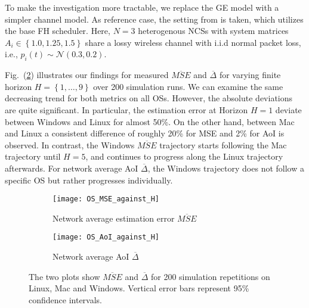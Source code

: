 To make the investigation more tractable, we replace the GE model with a simpler
channel model. As reference case, the setting from \cite{ayan2020aoi} is taken,
which utilizes the base FH scheduler. Here, $N=3$ heterogenous NCSs with system
matrices $A_i\in\left\{1.0, 1.25, 1.5 \right\}$ share a lossy wireless channel
with i.i.d normal packet loss, i.e., $p_i(t) \sim \mathcal{N}(0.3,0.2)$. 

Fig.~(\ref{fig:observation}) illustrates our findings for measured
$\overline{MSE}$ and $\overline{\Delta}$ for varying finite horizon $H=\left\{1,
\dots, 9\right\}$ over 200 simulation runs. We can examine the same decreasing
trend for both metrics on all OSs. However, the absolute deviations are quite
significant. In particular, the estimation error at Horizon $H=1$ deviate
between Windows and Linux for almost 50\%. On the other hand, between Mac and
Linux a consistent difference of roughly 20\% for MSE and 2\% for AoI is
observed. In contrast, the Windows $\overline{MSE}$ trajectory starts following
the Mac trajectory until $H=5$, and continues to progress along the Linux
trajectory afterwards. For network average AoI $\overline{\Delta}$, the Windows
trajectory does not follow a specific OS but rather progresses individually.

\begin{figure}[htb]
  \centering
  \begin{subfigure}[b]{0.49\textwidth}
    \centering
    \texttt{[image: OS\_MSE\_against\_H]} 
    \caption{Network average estimation error $\overline{MSE}$}
    \label{fig:osmse}
  \end{subfigure}
  \hfill
  \begin{subfigure}[b]{0.49\textwidth}
    \centering
    \texttt{[image: OS\_AoI\_against\_H]} 
    \caption{Network average AoI $\overline{\Delta}$}
  \end{subfigure}
  \caption[Comparison of network average MSE and AoI for different OS]{The two
  plots show $\overline{MSE}$ and $\overline{\Delta}$ for 200 simulation
  repetitions on Linux, Mac and Windows. Vertical error bars represent 95\%
  confidence intervals.}
  \label{fig:observation}
\end{figure}

